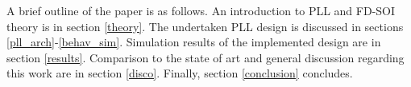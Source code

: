  A brief outline of the paper is as follows. An introduction to PLL and FD-SOI theory is in section \ref{theory}. The undertaken PLL design is discussed in sections \ref{pll_arch}-\ref{behav_sim}. Simulation results of the implemented design are in section \ref{results}. Comparison to the state of art and general discussion regarding this work are in section \ref{disco}. Finally, section \ref{conclusion} concludes. 
%
%
%
%
%

